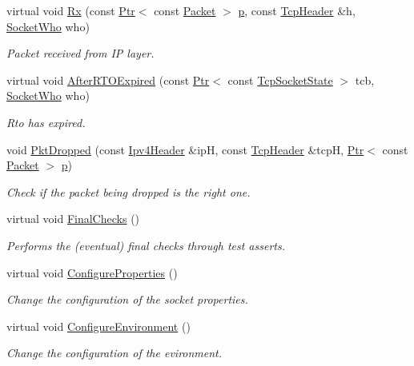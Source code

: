\begin{DoxyCompactItemize}
virtual void \hyperlink{classTcpFastRetrTest_a0536f0bc29c14387d0ce0f9bba7233ee}{Rx} (const \hyperlink{classns3_1_1Ptr}{Ptr}$<$ const \hyperlink{classns3_1_1Packet}{Packet} $>$ \hyperlink{lte__link__budget__x2__handover__measures_8m_ac9de518908a968428863f829398a4e62}{p}, const \hyperlink{classns3_1_1TcpHeader}{Tcp\+Header} \&h, \hyperlink{classns3_1_1TcpGeneralTest_a29338e6b7137cad650c2ff835713f6ee}{Socket\+Who} who)
\begin{DoxyCompactList}\small\item\em Packet received from IP layer. \end{DoxyCompactList}\item 
virtual void \hyperlink{classTcpFastRetrTest_a30299e24646799e65182835f20f02626}{After\+R\+T\+O\+Expired} (const \hyperlink{classns3_1_1Ptr}{Ptr}$<$ const \hyperlink{classns3_1_1TcpSocketState}{Tcp\+Socket\+State} $>$ tcb, \hyperlink{classns3_1_1TcpGeneralTest_a29338e6b7137cad650c2ff835713f6ee}{Socket\+Who} who)
\begin{DoxyCompactList}\small\item\em Rto has expired. \end{DoxyCompactList}\item 
void \hyperlink{classTcpFastRetrTest_ade4e22b563eb4de3c06f28691849078d}{Pkt\+Dropped} (const \hyperlink{classns3_1_1Ipv4Header}{Ipv4\+Header} \&ipH, const \hyperlink{classns3_1_1TcpHeader}{Tcp\+Header} \&tcpH, \hyperlink{classns3_1_1Ptr}{Ptr}$<$ const \hyperlink{classns3_1_1Packet}{Packet} $>$ \hyperlink{lte__link__budget__x2__handover__measures_8m_ac9de518908a968428863f829398a4e62}{p})
\begin{DoxyCompactList}\small\item\em Check if the packet being dropped is the right one. \end{DoxyCompactList}\item 
virtual void \hyperlink{classTcpFastRetrTest_a4fb643a4168b0f7f5b4ef89c8762f07b}{Final\+Checks} ()
\begin{DoxyCompactList}\small\item\em Performs the (eventual) final checks through test asserts. \end{DoxyCompactList}\item 
virtual void \hyperlink{classTcpFastRetrTest_ae5c620c13d9c1c567534aef6f0b5ed15}{Configure\+Properties} ()
\begin{DoxyCompactList}\small\item\em Change the configuration of the socket properties. \end{DoxyCompactList}\item 
virtual void \hyperlink{classTcpFastRetrTest_ae0e3ccc33f94b9412720ee80e3a67aec}{Configure\+Environment} ()
\begin{DoxyCompactList}\small\item\em Change the configuration of the evironment. \end{DoxyCompactList}\end{DoxyCompactItemize}
